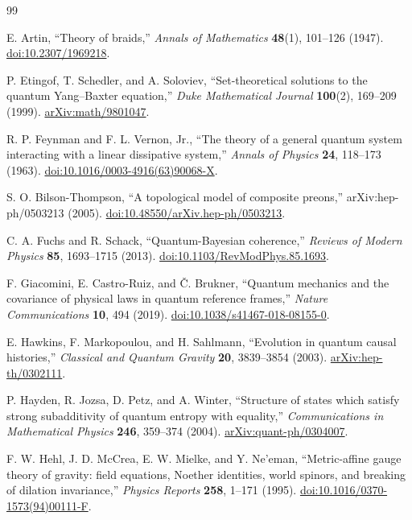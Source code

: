 \documentclass[11pt]{article}
\theoremstyle{definition}
\theoremstyle{remark}
\begin{document}
\begin{thebibliography}{99}
\raggedright
\small

E. Artin, ``Theory of braids,'' \emph{Annals of Mathematics} \textbf{48}(1), 101--126 (1947). \href{https://doi.org/10.2307/1969218}{doi:10.2307/1969218}.

P. Etingof, T. Schedler, and A. Soloviev, ``Set-theoretical solutions to the quantum Yang--Baxter equation,'' \emph{Duke Mathematical Journal} \textbf{100}(2), 169--209 (1999). \href{https://arxiv.org/abs/math/9801047}{arXiv:math/9801047}.

R. P. Feynman and F. L. Vernon, Jr., ``The theory of a general quantum system interacting with a linear dissipative system,'' \emph{Annals of Physics} \textbf{24}, 118--173 (1963). \href{https://doi.org/10.1016/0003-4916(63)90068-X}{doi:10.1016/0003-4916(63)90068-X}.

S. O. Bilson-Thompson, ``A topological model of composite preons,'' arXiv:hep-ph/0503213 (2005). \href{https://doi.org/10.48550/arXiv.hep-ph/0503213}{doi:10.48550/arXiv.hep-ph/0503213}.

C. A. Fuchs and R. Schack, ``Quantum-Bayesian coherence,'' \emph{Reviews of Modern Physics} \textbf{85}, 1693--1715 (2013). \href{https://doi.org/10.1103/RevModPhys.85.1693}{doi:10.1103/RevModPhys.85.1693}.

F. Giacomini, E. Castro-Ruiz, and \v{C}. Brukner, ``Quantum mechanics and the covariance of physical laws in quantum reference frames,'' \emph{Nature Communications} \textbf{10}, 494 (2019). \href{https://doi.org/10.1038/s41467-018-08155-0}{doi:10.1038/s41467-018-08155-0}.

E. Hawkins, F. Markopoulou, and H. Sahlmann, ``Evolution in quantum causal histories,'' \emph{Classical and Quantum Gravity} \textbf{20}, 3839--3854 (2003). \href{https://arxiv.org/abs/hep-th/0302111}{arXiv:hep-th/0302111}.

P. Hayden, R. Jozsa, D. Petz, and A. Winter, ``Structure of states which satisfy strong subadditivity of quantum entropy with equality,'' \emph{Communications in Mathematical Physics} \textbf{246}, 359--374 (2004). \href{https://arxiv.org/abs/quant-ph/0304007}{arXiv:quant-ph/0304007}.

F. W. Hehl, J. D. McCrea, E. W. Mielke, and Y. Ne'eman, ``Metric-affine gauge theory of gravity: field equations, Noether identities, world spinors, and breaking of dilation invariance,'' \emph{Physics Reports} \textbf{258}, 1--171 (1995). \href{https://doi.org/10.1016/0370-1573(94)00111-F}{doi:10.1016/0370-1573(94)00111-F}.


\end{thebibliography}
\end{document}
